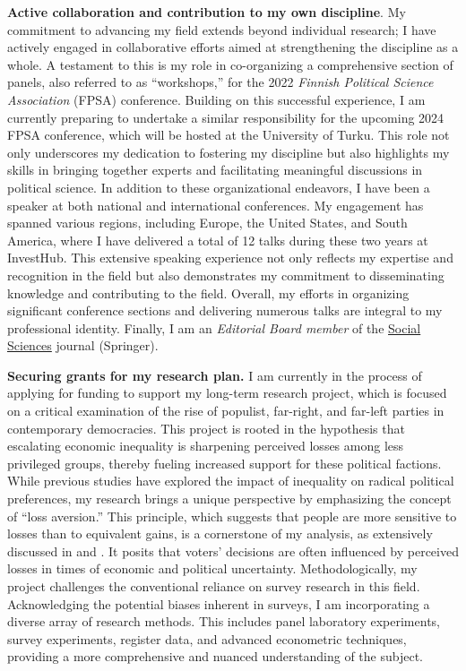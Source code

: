 \documentclass[10pt,stdletter,dateno,sigleft]{newlfm} %
\begin{document}
\begin{newlfm}
\newpage

{\bf Active collaboration and contribution to my own discipline}. My commitment to advancing my field extends beyond individual research; I have actively engaged in collaborative efforts aimed at strengthening the discipline as a whole. A testament to this is my role in co-organizing a comprehensive section of panels, also referred to as ``workshops,'' for the 2022 \emph{Finnish Political Science Association} (FPSA) conference. Building on this successful experience, I am currently preparing to undertake a similar responsibility for the upcoming 2024 FPSA conference, which will be hosted at the University of Turku. This role not only underscores my dedication to fostering my discipline but also highlights my skills in bringing together experts and facilitating meaningful discussions in political science. In addition to these organizational endeavors, I have been a speaker at both national and international conferences. My engagement has spanned various regions, including Europe, the United States, and South America, where I have delivered a total of 12 talks during these two years at InvestHub. This extensive speaking experience not only reflects my expertise and recognition in the field but also demonstrates my commitment to disseminating knowledge and contributing to the field. Overall, my efforts in organizing significant conference sections and delivering numerous talks are integral to my professional identity. Finally, I am an \emph{Editorial Board member} of the \href{https://www.springer.com/journal/43545}{Social Sciences} journal (Springer).



{\bf Securing grants for my research plan.} I am currently in the process of applying for funding to support my long-term research project, which is focused on a critical examination of the rise of populist, far-right, and far-left parties in contemporary democracies. This project is rooted in the hypothesis that escalating economic inequality is sharpening perceived losses among less privileged groups, thereby fueling increased support for these political factions. While previous studies have explored the impact of inequality on radical political preferences, my research brings a unique perspective by emphasizing the concept of ``loss aversion.'' This principle, which suggests that people are more sensitive to losses than to equivalent gains, is a cornerstone of my analysis, as extensively discussed in \textcite{Bahamonde2022b} and \textcite{Bahamonde2023}. It posits that voters' decisions are often influenced by perceived losses in times of economic and political uncertainty. Methodologically, my project challenges the conventional reliance on survey research in this field. Acknowledging the potential biases inherent in surveys, I am incorporating a diverse array of research methods. This includes panel laboratory experiments, survey experiments, register data, and advanced econometric techniques, providing a more comprehensive and nuanced understanding of the subject.


\end{newlfm}
\end{document}

